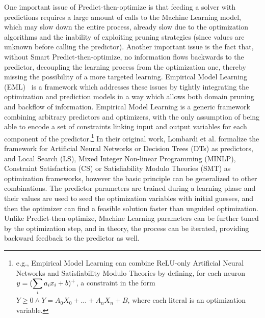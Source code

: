 One important issue of Predict-then-optimize is that feeding a solver with predictions requires a large amount of calls to the Machine Learning model, which may slow down the entire process, already slow due to the optimization algorithms and the inability of exploiting pruning strategies (since values are unknown before calling the predictor). Another important issue is the fact that, without Smart Predict-then-optimize, no information flows backwards to the predictor, decoupling the learning process from the optimization one, thereby missing the possibility of a more targeted learning.
Empirical Model Learning (EML)~\cite{lombardi2017empirical} is a framework which addresses these issues by tightly integrating the optimization and prediction models in a way which allows both domain pruning and backflow of information.
Empirical Model Learning is a generic framework combining arbitrary predictors and optimizers, with the only assumption of being able to encode a set of constraints linking input and output variables for each component of the predictor.\footnote{e.g., Empirical Model Learning can combine ReLU-only Artificial Neural Networks and Satisfiability Modulo Theories by defining, for each neuron $y = (\displaystyle\sum_i {a}_i {x}_i + b)^+$, a constraint in the form $Y \geq 0 \wedge Y = A_0 X_0 + \dots + A_n X_n + B$, where each literal is an optimization variable.}
%
In their original work, Lombardi et al. formalize the framework for Artificial Neural Networks or Decision Trees (DTs) as predictors, and Local Search (LS), Mixed Integer Non-linear Programming (MINLP), Constraint Satisfaction (CS) or Satisfiability Modulo Theories (SMT) as optimization frameworks, however the basic principle can be generalized to other combinations.
The predictor parameters are trained during a learning phase and their values are used to seed the optimization variables with initial guesses, and then the optimizer can find a feasible solution faster than unguided optimization. Unlike Predict-then-optimize, Machine Learning parameters can be further tuned by the optimization step, and in theory, the process can be iterated, providing backward feedback to the predictor as well.

